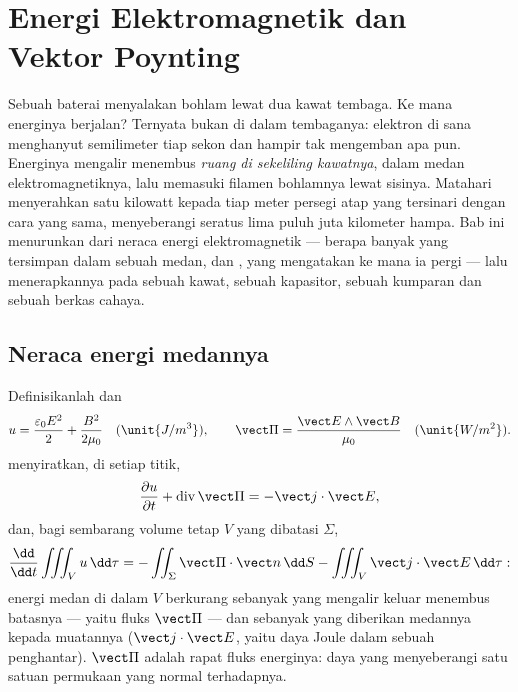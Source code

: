 \chapter{Energi Elektromagnetik dan Vektor Poynting}\label{ch:b2:poynting-vector}

Sebuah baterai menyalakan bohlam lewat dua kawat tembaga. Ke mana
energinya berjalan? Ternyata bukan di dalam tembaganya: elektron di
sana menghanyut semilimeter tiap sekon dan hampir tak mengemban apa pun.
Energinya mengalir menembus \emph{ruang di sekeliling kawatnya}, dalam
medan elektromagnetiknya, lalu memasuki filamen bohlamnya lewat
sisinya. Matahari menyerahkan satu kilowatt kepada tiap meter persegi atap
yang tersinari dengan cara yang sama, menyeberangi seratus lima puluh juta kilometer
hampa. Bab ini menurunkan dari  neraca
energi elektromagnetik --- berapa banyak yang tersimpan dalam sebuah medan, dan
, yang mengatakan ke mana ia pergi --- lalu menerapkannya pada
sebuah kawat, sebuah kapasitor, sebuah kumparan dan sebuah berkas cahaya.

\section{Neraca energi medannya}

\begin{theorem}\label{thm:b2:poynting-vector:poynting}
Definisikanlah \emph{} dan \emph{}
\[
u = \frac{\varepsilon_0E^2}2 + \frac{B^2}{2\mu_0} \quad (\unit{J/m^3}) , \qquad
\vect\Pi = \frac{\vect E\wedge\vect B}{\mu_0} \quad (\unit{W/m^2}) .
\]
 menyiratkan, di setiap titik,
\[
\frac{\partial u}{\partial t} + \operatorname{div}\vect\Pi = -\vect j\cdot\vect E ,
\]
dan, bagi sembarang volume tetap $V$ yang dibatasi $\Sigma$,
\[
\frac{\dd}{\dd t}\iiint_Vu\,\dd\tau = -\iint_\Sigma\vect\Pi\cdot\vect n\,\dd S - \iiint_V\vect j\cdot\vect E\,\dd\tau :
\]
energi medan di dalam $V$ berkurang sebanyak yang mengalir keluar menembus
batasnya --- yaitu fluks $\vect\Pi$ --- dan sebanyak yang diberikan medannya kepada
muatannya ($\vect j\cdot\vect E$, yaitu daya Joule dalam sebuah penghantar). $\vect\Pi$
adalah rapat fluks energinya: daya yang menyeberangi satu satuan permukaan yang normal
terhadapnya.
\end{theorem}

